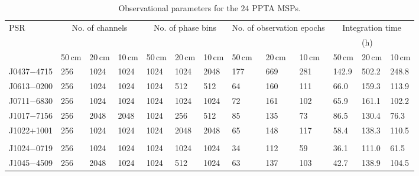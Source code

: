 \documentclass[useAMS,usenatbib]{mn2e}
\begin{document}
\begin{table}
\caption{Observational parameters for the $24$ PPTA MSPs.}
\label{obs}
\begin{center}
\begin{tabular}{p{1.5cm}p{0.9cm}<{\centering}p{0.9cm}<{\centering}p{0.9cm}<{\centering}p{0.9cm}<{\centering}p{0.9cm}<{\centering}p{0.9cm}<{\centering}p{0.9cm}<{\centering}p{0.9cm}<{\centering}p{0.9cm}<{\centering}p{0.9cm}<{\centering}p{0.9cm}<{\centering}p{0.9cm}<{\centering}}
\hline
PSR         &     \multicolumn{3}{c}{No. of channels}   &   \multicolumn{3}{c}{No. of phase bins}  &    \multicolumn{3}{c}{No. of observation epochs}   &    \multicolumn{3}{c}{Integration time}      \\
            &         &                 &          &         &             &          &         &             &          &         &   (h)            &       \\
            & 50\,cm &    20\,cm     & 10\,cm &  50\,cm &    20\,cm     & 10\,cm &  50\,cm &    20\,cm     & 10\,cm &  50\,cm &    20\,cm     & 10\,cm     \\
\hline
J0437$-$4715&  256    &    1024         &   1024   &  1024   &  1024       &  2048    &  177    &  669        & 281      &  142.9  &    502.2         &  248.8   \\
J0613$-$0200&  256    &    1024         &   1024   &  1024   &  512        &  512     &  64     &  160        & 111      &  66.0   &    159.3         &  113.9   \\
J0711$-$6830&  256    &    1024         &   1024   &  1024   &  1024       &  1024    &  72     &  161        & 102      &  65.9   &    161.1         &  102.2   \\
J1017$-$7156&  256    &    2048         &   2048   &  1024   &  256        &  512     &  85     &  135        & 73       &  86.5   &    130.4         &  76.3    \\
J1022$+$1001&  256    &    1024         &   1024   &  1024   &  2048       &  2048    &  65     &  148        & 117      &  58.4   &    138.3         &  110.5    \\
						&         &                 &          &         &             &          &         &             &          &         &                  &           \\
J1024$-$0719&  256    &    1024         &   1024   &  1024   &  1024       &  1024    &  34     &  112        & 59       &  36.1   &    111.0         &  61.5     \\
J1045$-$4509&  256    &    2048         &   1024   &  1024   &  512        &  1024    &  63     &  137        & 103      &  42.7   &    138.9         &  104.5    \\ 

\end{tabular}
\end{center}
\end{table}
\end{document}
